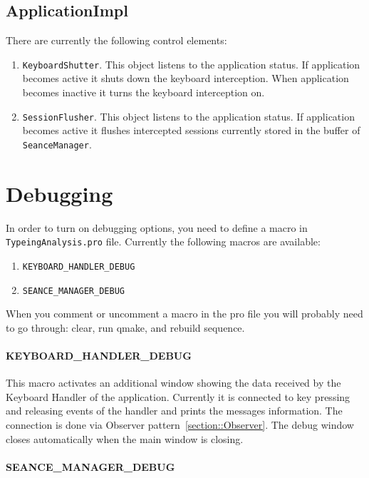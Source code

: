 \documentclass{article}
\begin{document}
\subsection{ApplicationImpl}

There are currently the following control elements:
\begin{enumerate}
\item \verb"KeyboardShutter". This object listens to the application status. If application becomes active it shuts down the keyboard interception. When application becomes inactive it turns the keyboard interception on.

\item \verb"SessionFlusher". This object listens to the application status. If application becomes active it flushes intercepted sessions currently stored in the buffer of \verb"SeanceManager".
\end{enumerate}



\section{Debugging}\label{section::Debugging}

In order to turn on debugging options, you need to define a macro in \verb"TypeingAnalysis.pro" file. Currently the following macros are available:
\begin{enumerate}
\item \verb"KEYBOARD_HANDLER_DEBUG"
\item \verb"SEANCE_MANAGER_DEBUG"
\end{enumerate}

When you comment or uncomment a macro in the pro file you will probably need to go through: clear, run qmake, and rebuild sequence.

\paragraph{KEYBOARD\_HANDLER\_DEBUG}

This macro activates an additional window showing the data received by the Keyboard Handler of the application. Currently it is connected to key pressing and releasing events of the handler and prints the messages information. The connection is done via Observer pattern~\ref{section::Observer}. The debug window closes automatically when the main window is closing.

\paragraph{SEANCE\_MANAGER\_DEBUG}
\end{document}
